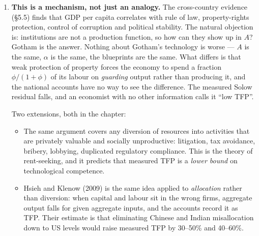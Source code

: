 \documentclass[12pt, letterpaper]{article}
\begin{document}
\begin{tcolorbox}[oddbox,title={Problem 5.5 \quad Sources of TFP}]
\begin{enumerate}
\smallskip
It is worth pushing this to the long run, because that is where the number becomes
interpretable. In a Solow steady state with $Y=\tilde A K^{\alpha}N^{1-\alpha}$ and
$n=g=0$,
\[
\frac{Y}{N}\bigg|_{ss}
=\tilde A^{\frac{1}{1-\alpha}}\left(\frac{s}{\delta}\right)^{\frac{\alpha}{1-\alpha}},
\qquad
\tilde A^{\frac{1}{1-\alpha}}=A^{\frac{1}{1-\alpha}}\,\frac{1}{1+\phi},
\]
so long-run GDP per person, \emph{and the wage with it}, fall by exactly
\[
\boxed{\frac{1}{1+\phi}} ,
\]
which is one half when $\phi=1$. \checkmark\ The exponents cancel and leave something
transparent: in the long run the economy loses output in exact proportion to the fraction of
its labour force that is not producing anything. The $(1-\alpha)$ in the TFP formula is an
artefact of holding $K$ fixed; once capital adjusts, the loss is one-for-one.

\item \textbf{This is a mechanism, not just an analogy.} The cross-country evidence (\S5.5)
finds that GDP per capita correlates with rule of law, property-rights protection, control
of corruption and political stability. The natural objection is: institutions are not a
production function, so how can they show up in $A$? Gotham is the answer. Nothing about
Gotham's technology is worse --- $A$ is the same, $\alpha$ is the same, the blueprints are
the same. What differs is that weak protection of property forces the economy to spend a
fraction $\phi/(1+\phi)$ of its labour on \emph{guarding} output rather than producing it,
and the national accounts have no way to see the difference. The measured Solow residual
falls, and an economist with no other information calls it ``low TFP''.

\smallskip
Two extensions, both in the chapter:
\begin{itemize}[leftmargin=1.3em,itemsep=2pt,topsep=3pt]
\item The same argument covers any diversion of resources into activities that are privately
      valuable and socially unproductive: litigation, tax avoidance, bribery, lobbying,
      duplicated regulatory compliance. This is the theory of rent-seeking, and it predicts
      that measured TFP is a \emph{lower bound} on technological competence.
\item Hsieh and Klenow (2009) is the same idea applied to \emph{allocation} rather than
      diversion: when capital and labour sit in the wrong firms, aggregate output falls for
      given aggregate inputs, and the accounts record it as TFP. Their estimate is that
      eliminating Chinese and Indian misallocation down to US levels would raise measured TFP
      by 30--50\% and 40--60\%.
\end{itemize}


\end{enumerate}
\end{tcolorbox}
\end{document}
